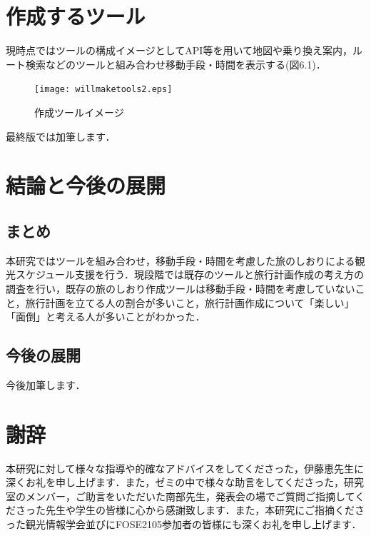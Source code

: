 \documentclass{funthesis}
\begin{document}
\chapter{作成するツール}%

現時点ではツールの構成イメージとしてAPI等を用いて地図や乗り換え案内，ルート検索などのツールと組み合わせ移動手段・時間を表示する(図6.1)．
\begin{figure}[htpb]
\begin{center}
\texttt{[image: willmaketools2.eps]}
\end{center}
\caption{作成ツールイメージ}
\end{figure}

最終版では加筆します．

\chapter{結論と今後の展開}%

\section{まとめ}

本研究ではツールを組み合わせ，移動手段・時間を考慮した旅のしおりによる観光スケジュール支援を行う．現段階では既存のツールと旅行計画作成の考え方の調査を行い，既存の旅のしおり作成ツールは移動手段・時間を考慮していないこと，旅行計画を立てる人の割合が多いこと，旅行計画作成について「楽しい」「面倒」と考える人が多いことがわかった．\\



\section{今後の展開}
今後加筆します．



\chapter*{謝辞}
本研究に対して様々な指導や的確なアドバイスをしてくださった，伊藤恵先生に深くお礼を申し上げます．また，ゼミの中で様々な助言をしてくださった，研究室のメンバー，ご助言をいただいた南部先生，発表会の場でご質問ご指摘してくださった先生や学生の皆様に心から感謝致します．また，本研究にご指摘くださった観光情報学会並びにFOSE2105参加者の皆様にも深くお礼を申し上げます．
\end{document}
